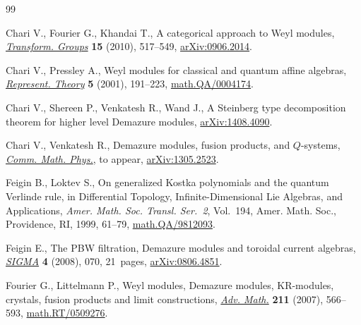 \documentclass[10pt,a4paper]{amsart}
\begin{document}
\begin{thebibliography}{99}
\footnotesize \itemsep=0pt

Chari V., Fourier G., Khandai T., A categorical approach to {W}eyl modules,
  \href{http://dx.doi.org/10.1007/s00031-010-9090-9}{\textit{Transform. Groups}} \textbf{15} (2010), 517--549, \href{http://arxiv.org/abs/0906.2014}{arXiv:0906.2014}.

Chari V., Pressley A., Weyl modules for classical and quantum af\/fine algebras,
  \href{http://dx.doi.org/10.1090/S1088-4165-01-00115-7}{\textit{Represent. Theory}} \textbf{5} (2001), 191--223,
  \href{http://arxiv.org/abs/math.QA/0004174}{math.QA/0004174}.

Chari V., Shereen P., Venkatesh R., Wand J., A Steinberg type decomposition
  theorem for higher level Demazure modules, \href{http://arxiv.org/abs/1408.4090}{arXiv:1408.4090}.

Chari V., Venkatesh R., Demazure modules, fusion products, and $Q$-systems,
  \href{http://dx.doi.org/10.1007/s00220-014-2175-x}{\textit{Comm. Math. Phys.}}, {t}o appear, \href{http://arxiv.org/abs/1305.2523}{arXiv:1305.2523}.

Feigin B., Loktev S., On generalized {K}ostka polynomials and the quantum
  {V}erlinde rule, in Dif\/ferential Topology, Inf\/inite-Dimensional {L}ie
  Algebras, and Applications, \textit{Amer. Math. Soc. Transl. Ser.~2}, Vol.~194, Amer. Math. Soc., Providence, RI, 1999, 61--79,
  \href{http://arxiv.org/abs/math.QA/9812093}{math.QA/9812093}.

Feigin E., The {PBW} f\/iltration, {D}emazure modules and toroidal current
  algebras, \href{http://dx.doi.org/10.3842/SIGMA.2008.070}{\textit{SIGMA}} \textbf{4} (2008), 070, 21~pages,
  \href{http://arxiv.org/abs/0806.4851}{arXiv:0806.4851}.

Fourier G., Littelmann P., Weyl modules, {D}emazure modules, {KR}-modules,
  crystals, fusion products and limit constructions, \href{http://dx.doi.org/10.1016/j.aim.2006.09.002}{\textit{Adv. Math.}}
  \textbf{211} (2007), 566--593, \href{http://arxiv.org/abs/math.RT/0509276}{math.RT/0509276}.


\end{thebibliography}
\end{document}

